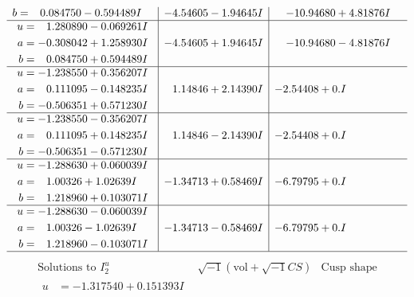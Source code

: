 \documentclass[1p]{elsarticle_modified}
\theoremstyle{definition}
\newcommand{\I}{\sqrt{-1}}
\begin{document}
$$\begin{array}{c|c|c}
\begin{aligned}
b &= \phantom{-}0.084750 - 0.594489 I\end{aligned}
 & -4.54605 - 1.94645 I & -10.94680 + 4.81876 I \\ \hline\begin{aligned}
u &= \phantom{-}1.280890 - 0.069261 I \\
a &= -0.308042 + 1.258930 I \\
b &= \phantom{-}0.084750 + 0.594489 I\end{aligned}
 & -4.54605 + 1.94645 I & -10.94680 - 4.81876 I \\ \hline\begin{aligned}
u &= -1.238550 + 0.356207 I \\
a &= \phantom{-}0.111095 - 0.148235 I \\
b &= -0.506351 + 0.571230 I\end{aligned}
 & \phantom{-}1.14846 + 2.14390 I & -2.54408 + 0. I\phantom{ +0.000000I} \\ \hline\begin{aligned}
u &= -1.238550 - 0.356207 I \\
a &= \phantom{-}0.111095 + 0.148235 I \\
b &= -0.506351 - 0.571230 I\end{aligned}
 & \phantom{-}1.14846 - 2.14390 I & -2.54408 + 0. I\phantom{ +0.000000I} \\ \hline\begin{aligned}
u &= -1.288630 + 0.060039 I \\
a &= \phantom{-}1.00326 + 1.02639 I \\
b &= \phantom{-}1.218960 + 0.103071 I\end{aligned}
 & -1.34713 + 0.58469 I & -6.79795 + 0. I\phantom{ +0.000000I} \\ \hline\begin{aligned}
u &= -1.288630 - 0.060039 I \\
a &= \phantom{-}1.00326 - 1.02639 I \\
b &= \phantom{-}1.218960 - 0.103071 I\end{aligned}
 & -1.34713 - 0.58469 I & -6.79795 + 0. I\phantom{ +0.000000I}\\
 \hline 
 \end{array}$$\newpage$$\begin{array}{c|c|c}  
\text{Solutions to }I^u_{2}& \I (\text{vol} + \sqrt{-1}CS) & \text{Cusp shape}\\
 \hline 
\begin{aligned}
u &= -1.317540 + 0.151393 I \\

\end{aligned}
\end{array}$$
\end{document}
